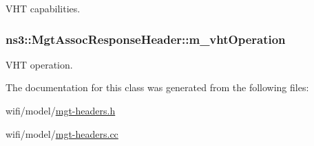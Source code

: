 V\+HT capabilities. 

\subsubsection[{\texorpdfstring{m\+\_\+vht\+Operation}{m_vhtOperation}}]{ ns3\+::\+Mgt\+Assoc\+Response\+Header\+::m\+\_\+vht\+Operation\hspace{0.3cm}{\ttfamily [private]}}\hypertarget{classns3_1_1MgtAssocResponseHeader_a278be81f97bb87d233df3ee9f7f9882a}{}\label{classns3_1_1MgtAssocResponseHeader_a278be81f97bb87d233df3ee9f7f9882a}


V\+HT operation. 



The documentation for this class was generated from the following files\+:\begin{DoxyCompactItemize}
\item 
wifi/model/\hyperlink{mgt-headers_8h}{mgt-\/headers.\+h}\item 
wifi/model/\hyperlink{mgt-headers_8cc}{mgt-\/headers.\+cc}\end{DoxyCompactItemize}

